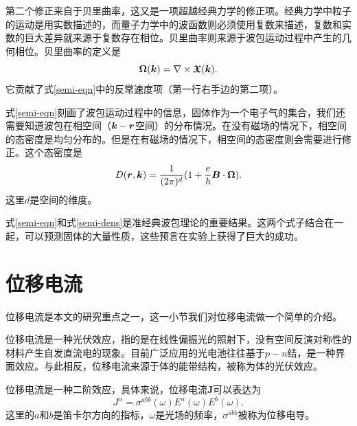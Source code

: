 第二个修正来自于贝里曲率，这又是一项超越经典力学的修正项。经典力学中粒子的运动是用实数描述的，而量子力学中的波函数则必须使用复数来描述，复数和实数的巨大差异就来源于复数存在相位。贝里曲率则来源于波包运动过程中产生的几何相位。贝里曲率的定义是
\begin{equation}
\boldsymbol{\Omega}(\boldsymbol{k}) = \nabla\times\boldsymbol{\mathfrak{X}}(\boldsymbol{k}).
\end{equation}
它贡献了式\ref{semi-eqn}中的反常速度项（第一行右手边的第二项）。

式\ref{semi-eqn}刻画了波包运动过程中的信息，固体作为一个电子气的集合，我们还需要知道波包在相空间（$\boldsymbol{k}-\boldsymbol{r}$空间）的分布情况。在没有磁场的情况下，相空间的态密度是均匀分布的。但是在有磁场的情况下，相空间的态密度则会需要进行修正。这个态密度是
\begin{equation}
D(\boldsymbol{r},\boldsymbol{k})=\frac{1}{(2\pi)^d}(1+\frac{e}{\hbar}\boldsymbol{B}\cdot\boldsymbol{\Omega}).\label{semi-dens}
\end{equation}
这里$d$是空间的维度。

式\ref{semi-eqn}和式\ref{semi-dens}是准经典波包理论的重要结果。这两个式子结合在一起，可以预测固体的大量性质，这些预言在实验上获得了巨大的成功。

\section{位移电流}

位移电流\cite{tan_shift_2016}是本文的研究重点之一，这一小节我们对位移电流做一个简单的介绍。

位移电流是一种光伏效应，指的是在线性偏振光的照射下，没有空间反演对称性的材料产生自发直流电的现象。目前广泛应用的光电池往往基于$p-n$结，是一种界面效应。与此相反，位移电流来源于体的能带结构，被称为体的光伏效应。

位移电流是一种二阶效应，具体来说，位移电流$\boldsymbol{J}$可以表达为
\begin{equation}
J^\alpha = \sigma^{abb}(\omega) E^a(\omega) E^b(\omega).
\end{equation}
这里的$a$和$b$是笛卡尔方向的指标，$\omega$是光场的频率，$\sigma^{abb}$被称为位移电导。

